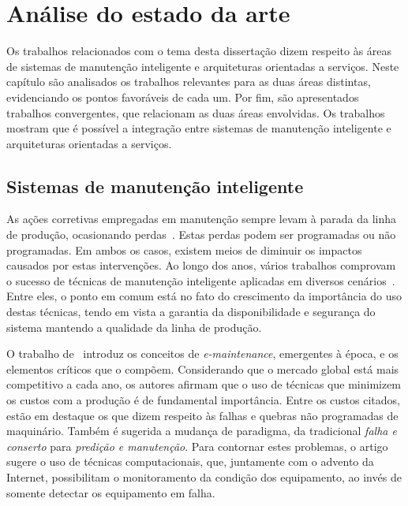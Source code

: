 \chapter{Análise do estado da arte}
\label{cha:estado-arte}

Os trabalhos relacionados com o tema desta dissertação dizem respeito às áreas de sistemas de
manutenção inteligente e arquiteturas orientadas a serviços. Neste capítulo são analisados os
trabalhos relevantes para as duas áreas distintas, evidenciando os pontos favoráveis de cada um. Por
fim, são apresentados trabalhos convergentes, que relacionam as duas áreas envolvidas. Os trabalhos
mostram que é possível a integração entre sistemas de manutenção inteligente e arquiteturas
orientadas a serviços.


\section{Sistemas de manutenção inteligente}
\label{sec:arte-manutencao-inteligente}

As ações corretivas empregadas em manutenção sempre levam à parada da linha de produção, ocasionando
perdas~\cite{carvajal2011sobre}. Estas perdas podem ser programadas ou não programadas. Em ambos os
casos, existem meios de diminuir os impactos causados por estas intervenções. Ao longo dos anos,
vários trabalhos comprovam o sucesso de técnicas de manutenção inteligente aplicadas em diversos
cenários~\cite{muller2008concept}. Entre eles, o ponto em comum está no fato do crescimento da
importância do uso destas técnicas, tendo em vista a garantia da disponibilidade e segurança do
sistema mantendo a qualidade da linha de produção.

O trabalho de~\cite{lee2006intelligent} introduz os conceitos de \textit{e-maintenance}, emergentes
à época, e os elementos críticos que o compõem. Considerando que o mercado global está mais
competitivo a cada ano, os autores afirmam que o uso de técnicas que minimizem os custos com a
produção é de fundamental importância. Entre os custos citados, estão em destaque os que dizem
respeito às falhas e quebras não programadas de maquinário. Também é sugerida a mudança de
paradigma, da tradicional \emph{falha e conserto} para \emph{predição e manutenção}. Para contornar
estes problemas, o artigo sugere o uso de técnicas computacionais, que, juntamente com o advento da
Internet, possibilitam o monitoramento da condição dos equipamento, ao invés de somente detectar os
equipamento em falha.

